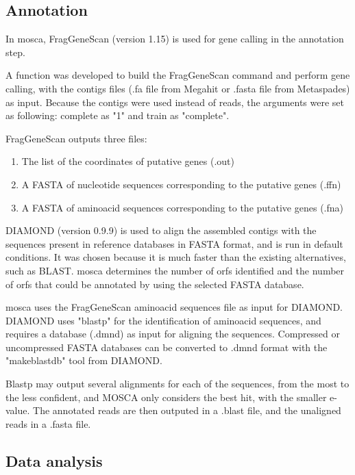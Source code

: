 \documentclass[
  oneside,
  11pt, a4paper,
  footinclude=true,
  headinclude=true,
  cleardoublepage=empty
]{scrbook}
\begin{document}
    \subsection{Annotation}
    
    In \gls{mosca}, FragGeneScan (version 1.15) is used for gene calling in the annotation step.
    
    A function was developed to build the FragGeneScan command and perform gene calling, with the contigs files (.fa file from Megahit or .fasta file from Metaspades) as input. Because the contigs were used instead of reads, the arguments were set as following: complete as "1" and train as "complete". 
    
    FragGeneScan outputs three files:
    \begin{enumerate}
        \item The list of the coordinates of putative genes (.out)
        \item A FASTA of nucleotide sequences corresponding to the putative genes (.ffn)
        \item A FASTA of aminoacid sequences corresponding to the putative genes (.fna)
    \end{enumerate}
    
    DIAMOND (version 0.9.9) is used to align the assembled contigs with the sequences present in reference databases in FASTA format, and is run in default conditions. It was chosen because it is much faster than the existing alternatives, such as BLAST. \gls{mosca} determines the number of \gls{orf}s identified and the number of \gls{orf}s that could be annotated by using the selected FASTA database. 
    
    \gls{mosca} uses the FragGeneScan aminoacid sequences file as input for DIAMOND. DIAMOND uses "blastp" for the identification of aminoacid sequences, and requires a database (.dmnd) as input for aligning the sequences. Compressed or uncompressed FASTA databases can be converted to .dmnd format with the "makeblastdb" tool from DIAMOND. 
    
    Blastp may output several alignments for each of the sequences, from the most to the less confident, and MOSCA only considers the best hit, with the smaller e-value. The annotated reads are then outputed in a .blast file, and the unaligned reads in a .fasta file.
    
    \subsection{Data analysis} 
    
\end{document}
